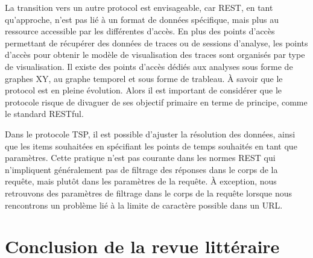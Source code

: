 La transition vers un autre protocol est envisageable, car REST, en tant qu'approche, n'est pas lié à un format de données spécifique, mais plus au ressource accessible par les différentes d'accès. En plus des points d'accès permettant de récupérer des données de traces ou de sessions d'analyse, les points d'accès pour obtenir le modèle de visualisation des traces sont organisés par type de visualisation. Il existe des points d'accès dédiés aux analyses sous forme de graphes XY, au graphe temporel et sous forme de trableau. À savoir que le protocol est en pleine évolution. Alors il est important de considérer que le protocole risque de divaguer de ses objectif primaire en terme de principe, comme le standard RESTful.

Dans le protocole TSP, il est possible d'ajuster la résolution des données, ainsi que les items souhaitées en spécifiant les points de temps souhaités en tant que paramètres. Cette pratique n'est pas courante dans les normes REST qui n'impliquent généralement pas de filtrage des réponses dans le corps de la requête, mais plutôt dans les paramètres de la requête. À exception, nous retrouvons des paramètres de filtrage dans le corps de la requête lorsque nous rencontrons un problème lié à la limite de caractère possible dans un URL.





\section{Conclusion de la revue littéraire}


